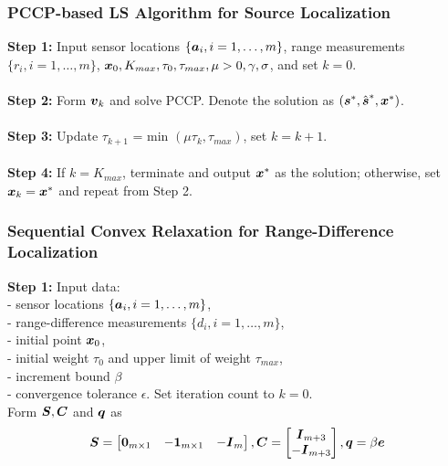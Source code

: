 \begin{frame}
\frametitle{PCCP-based LS Algorithm for Source Localization}
\phantom{m}
\textbf{Step 1:} Input sensor locations $\{\mbox{\boldmath$a$}_i, i = 1,\ldots,m\}$, range measurements $\{r_i, i = 1, \ldots, m\}$, $\mbox{\boldmath$x$}_0, K_{max}, \tau_0, \tau_{max}, \mu > 0, \gamma, \sigma$, and set $k = 0$. 
\\~\\
\textbf{Step 2:} Form  $\mbox{\boldmath$v$}_k$ and solve PCCP. Denote the solution as  $(\mbox{\boldmath$s$}^*, \hat{\mbox{\boldmath$s$}}^*, \mbox{\boldmath$x$}^*)$. 
\\~\\
\textbf{Step 3:} Update  $\tau_{k+1} $ = min $(\mu\tau_k, \tau_{max})$, set $k = k+1$. 
\\~\\
\textbf{Step 4:} If $k = K_{max}$, terminate and output $\mbox{\boldmath$x$}^*$ as the solution; otherwise, set $\mbox{\boldmath$x$}_k = \mbox{\boldmath$x$}^*$ and repeat from Step 2. 
\end{frame}

\begin{frame}
\frametitle{Sequential Convex Relaxation for Range-Difference Localization}
\phantom{m}
\textbf{Step 1:} Input data: \\
- sensor locations $\{\mbox{\boldmath$a$}_i, i=1,\ldots,m\}$, \\
- range-difference measurements $\{d_i, i=1,\ldots,m\}$, \\
- initial point $\mbox{\boldmath$x$}_0$, \\
- initial weight $\tau_0$ and upper limit of weight $\tau_{max}$, \\
- increment bound $\beta$ \\
-  convergence tolerance $\epsilon$. %
Set iteration count to $k = 0$. \\
Form $\mbox{\boldmath$S$}, \mbox{\boldmath$C$}$ and $\mbox{\boldmath$q$}$ as
\begin{equation}
\nonumber
\mbox{\boldmath$S$} = \begin{bmatrix}
\mbox{\boldmath${0}$}_{m \times 1} & -\mbox{\boldmath${1}$}_{m \times 1} & -\mbox{\boldmath${I}$}_m
\end{bmatrix},
\mbox{\boldmath$C$} = \begin{bmatrix}
\mbox{\boldmath${I}$}_{m+3} \\
-\mbox{\boldmath${I}$}_{m+3}
\end{bmatrix},
\mbox{\boldmath$q$} = \beta\mbox{\boldmath$e$}
\end{equation}
\end{frame}

